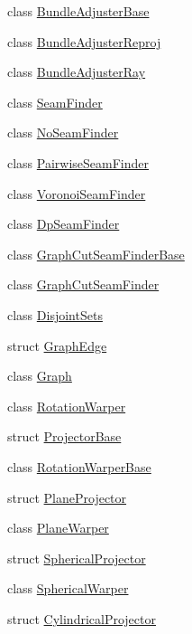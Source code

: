 \begin{DoxyCompactItemize}
\item 
class \hyperlink{classcv_1_1detail_1_1BundleAdjusterBase}{Bundle\-Adjuster\-Base}
\item 
class \hyperlink{classcv_1_1detail_1_1BundleAdjusterReproj}{Bundle\-Adjuster\-Reproj}
\item 
class \hyperlink{classcv_1_1detail_1_1BundleAdjusterRay}{Bundle\-Adjuster\-Ray}
\item 
class \hyperlink{classcv_1_1detail_1_1SeamFinder}{Seam\-Finder}
\item 
class \hyperlink{classcv_1_1detail_1_1NoSeamFinder}{No\-Seam\-Finder}
\item 
class \hyperlink{classcv_1_1detail_1_1PairwiseSeamFinder}{Pairwise\-Seam\-Finder}
\item 
class \hyperlink{classcv_1_1detail_1_1VoronoiSeamFinder}{Voronoi\-Seam\-Finder}
\item 
class \hyperlink{classcv_1_1detail_1_1DpSeamFinder}{Dp\-Seam\-Finder}
\item 
class \hyperlink{classcv_1_1detail_1_1GraphCutSeamFinderBase}{Graph\-Cut\-Seam\-Finder\-Base}
\item 
class \hyperlink{classcv_1_1detail_1_1GraphCutSeamFinder}{Graph\-Cut\-Seam\-Finder}
\item 
class \hyperlink{classcv_1_1detail_1_1DisjointSets}{Disjoint\-Sets}
\item 
struct \hyperlink{structcv_1_1detail_1_1GraphEdge}{Graph\-Edge}
\item 
class \hyperlink{classcv_1_1detail_1_1Graph}{Graph}
\item 
class \hyperlink{classcv_1_1detail_1_1RotationWarper}{Rotation\-Warper}
\item 
struct \hyperlink{structcv_1_1detail_1_1ProjectorBase}{Projector\-Base}
\item 
class \hyperlink{classcv_1_1detail_1_1RotationWarperBase}{Rotation\-Warper\-Base}
\item 
struct \hyperlink{structcv_1_1detail_1_1PlaneProjector}{Plane\-Projector}
\item 
class \hyperlink{classcv_1_1detail_1_1PlaneWarper}{Plane\-Warper}
\item 
struct \hyperlink{structcv_1_1detail_1_1SphericalProjector}{Spherical\-Projector}
\item 
class \hyperlink{classcv_1_1detail_1_1SphericalWarper}{Spherical\-Warper}
\item 
struct \hyperlink{structcv_1_1detail_1_1CylindricalProjector}{Cylindrical\-Projector}
\item 

\end{DoxyCompactItemize}
